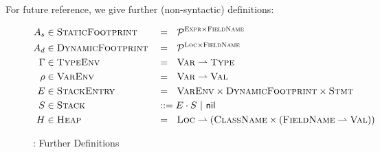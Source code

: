 For future reference, we give further (non-syntactic) definitions:
\begin{figure}[h]
    \begin{align*}
    A_s    & \in \textup{\textsc{StaticFootprint}} &  & =~~ \mathcal{P}^{\textup{\textsc{Expr}} \times \textup{\textsc{FieldName}}}                                                    \\
    A_d    & \in \textup{\textsc{DynamicFootprint}} &  & =~~ \mathcal{P}^{\textup{\textsc{Loc}} \times \textup{\textsc{FieldName}}}                                                     \\
    \Gamma & \in \textup{\textsc{TypeEnv}}    &  & =~~ \textup{\textsc{Var}} \rightharpoonup \textup{\textsc{Type}}                                                       \\
    \rho   & \in \textup{\textsc{VarEnv}}     &  & =~~ \textup{\textsc{Var}} \rightharpoonup \textup{\textsc{Val}}                                                        \\
    E      & \in \textup{\textsc{StackEntry}} &  & =~~ \textup{\textsc{VarEnv}} \times \textup{\textsc{DynamicFootprint}} \times \textup{\textsc{Stmt}}                                       \\
    S      & \in \textup{\textsc{Stack}}      &  & ::= E \cdot S ~|~ \textup{\textsf{nil}}                                                                     \\
    H      & \in \textup{\textsc{Heap}}       &  & =~~ \textup{\textsc{Loc}} \rightharpoonup (\textup{\textsc{ClassName}} \times (\textup{\textsc{FieldName}} \rightharpoonup \textup{\textsc{Val}}))
    \end{align*}
    \caption{\svlidf: Further Definitions}
\end{figure}



